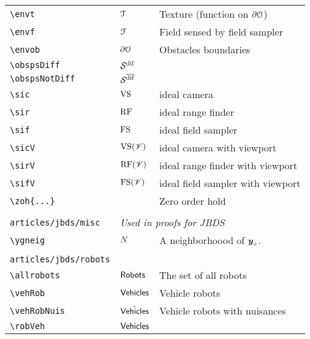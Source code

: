 \begin{longtable}{lll}
 {\color[rgb]{0.5,0.5,0.5}\texttt{\textbackslash envt}} & $\mathcal{T}$ &  Texture (function on $\partial \mathcal{O}$)\\ 
 {\color[rgb]{0.5,0.5,0.5}\texttt{\textbackslash envf}} & $\mathcal{F}$ &  Field sensed by field sampler\\ 
 {\color[rgb]{0.5,0.5,0.5}\texttt{\textbackslash envob}} & $\partial \mathcal{O}$ &  Obstacles boundaries\\ 
 {\color[rgb]{0.5,0.5,0.5}\texttt{\textbackslash obspsDiff}} & $\obspsDiff$ & \\ 
 {\color[rgb]{0.5,0.5,0.5}\texttt{\textbackslash obspsNotDiff}} & $\obspsNotDiff$ & \\ 
 {\color[rgb]{0.5,0.5,0.5}\texttt{\textbackslash sic}} & $\text{VS}$ &  ideal camera\\ 
 {\color[rgb]{0.5,0.5,0.5}\texttt{\textbackslash sir}} & $\text{RF}$ &  ideal range finder\\ 
 {\color[rgb]{0.5,0.5,0.5}\texttt{\textbackslash sif}} & $\text{FS}$ &  ideal field sampler\\ 
 {\color[rgb]{0.5,0.5,0.5}\texttt{\textbackslash sicV}} & $\text{VS}(\mathscr{V})$ &  ideal camera with viewport\\ 
 {\color[rgb]{0.5,0.5,0.5}\texttt{\textbackslash sirV}} & $\text{RF}(\mathscr{V})$ &  ideal range finder with viewport\\ 
 {\color[rgb]{0.5,0.5,0.5}\texttt{\textbackslash sifV}} & $\text{FS}(\mathscr{V})$ &  ideal field sampler with viewport\\ 
 {\color[rgb]{0.5,0.5,0.5}\texttt{\textbackslash zoh\{...\}}} &  &  Zero order hold\\ 
  &  & \\ 
 {\color[rgb]{0.5,0.5,0.5}\texttt{articles/jbds/misc}} & \multicolumn{2}{l}{\emph{Used in proofs for JBDS}}\\ 
 \hline
{\color[rgb]{0.5,0.5,0.5}\texttt{\textbackslash ygneig}} & $N$ &  A neighborhoood of $\boldsymbol{y}_{\circ}$.\\ 
  &  & \\ 
 {\color[rgb]{0.5,0.5,0.5}\texttt{articles/jbds/robots}} & \multicolumn{2}{l}{\emph{}}\\ 
 \hline
{\color[rgb]{0.5,0.5,0.5}\texttt{\textbackslash allrobots}} & $\mathsf{Robots}$ &  The set of all robots\\ 
 {\color[rgb]{0.5,0.5,0.5}\texttt{\textbackslash vehRob}} & $\mathsf{Vehicles}$ &  Vehicle robots\\ 
 {\color[rgb]{0.5,0.5,0.5}\texttt{\textbackslash vehRobNuis}} & ${\tilde{\mathsf{Vehicles}}}$ &  Vehicle robots with nuisances\\ 
 {\color[rgb]{0.5,0.5,0.5}\texttt{\textbackslash robVeh}} & $\mathsf{Vehicles}$ & \\ 

\end{longtable}
